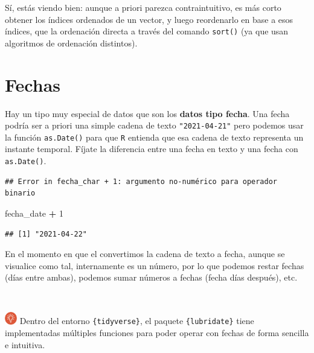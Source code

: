 \documentclass[11pt,]{book}
\newenvironment{Shaded}{\begin{snugshade}}{\end{snugshade}}
\newcommand{\DataTypeTok}[1]{\textcolor[rgb]{0.27,0.27,0.27}{#1}}
\newcommand{\DecValTok}[1]{\textcolor[rgb]{0.06,0.06,0.06}{#1}}
\newcommand{\KeywordTok}[1]{\textcolor[rgb]{0.27,0.27,0.27}{\textbf{#1}}}
\newcommand{\NormalTok}[1]{#1}
\newcommand{\OperatorTok}[1]{\textcolor[rgb]{0.43,0.43,0.43}{\textbf{#1}}}
\newcommand{\StringTok}[1]{\textcolor[rgb]{0.5,0.5,0.5}{#1}}
\begin{document}
Sí, estás viendo bien: aunque a priori parezca contraintuitivo, es más corto obtener los índices ordenados de un vector, y luego reordenarlo en base a esos índices, que la ordenación directa a través del comando \texttt{sort()} (ya que usan algoritmos de ordenación distintos).

\hypertarget{fechas}{%
\section{Fechas}\label{fechas}}

Hay un tipo muy especial de datos que son los \textbf{datos tipo fecha}. Una fecha podría ser a priori una simple cadena de texto \texttt{"2021-04-21"} pero podemos usar la función \texttt{as.Date()} para que \texttt{R} entienda que esa cadena de texto representa un instante temporal. Fíjate la diferencia entre una fecha en texto y una fecha con \texttt{as.Date()}.

\begin{Shaded}
\end{Shaded}

\begin{verbatim}
## Error in fecha_char + 1: argumento no-numérico para operador binario
\end{verbatim}

\begin{Shaded}
\begin{Highlighting}[]
\NormalTok{fecha_date }\OperatorTok{+}\StringTok{ }\DecValTok{1}
\end{Highlighting}
\end{Shaded}

\begin{verbatim}
## [1] "2021-04-22"
\end{verbatim}

En el momento en que el convertimos la cadena de texto a fecha, aunque se visualice como tal, internamente es un número, por lo que podemos restar fechas (días entre ambas), podemos sumar números a fechas (fecha días después), etc.

~

\includegraphics[width=0.04\textwidth,height=\textheight]{img/logo_info.png} Dentro del entorno \texttt{\{tidyverse\}}, el paquete \texttt{\{lubridate\}} tiene implementadas múltiples funciones para poder operar con fechas de forma sencilla e intuitiva.
\end{document}
